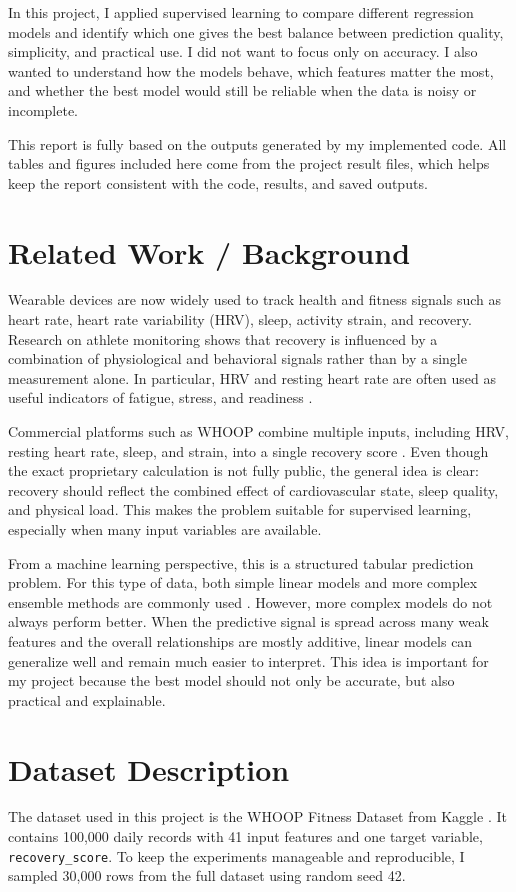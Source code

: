 \documentclass[conference]{IEEEtran}
\begin{document}
In this project, I applied supervised learning to compare different regression models and identify which one gives the best balance between prediction quality, simplicity, and practical use. I did not want to focus only on accuracy. I also wanted to understand how the models behave, which features matter the most, and whether the best model would still be reliable when the data is noisy or incomplete.

This report is fully based on the outputs generated by my implemented code. All tables and figures included here come from the project result files, which helps keep the report consistent with the code, results, and saved outputs.

\section{Related Work / Background}
Wearable devices are now widely used to track health and fitness signals such as heart rate, heart rate variability (HRV), sleep, activity strain, and recovery. Research on athlete monitoring shows that recovery is influenced by a combination of physiological and behavioral signals rather than by a single measurement alone. In particular, HRV and resting heart rate are often used as useful indicators of fatigue, stress, and readiness \cite{plews2013heart,bellenger2016monitoring}.

Commercial platforms such as WHOOP combine multiple inputs, including HRV, resting heart rate, sleep, and strain, into a single recovery score \cite{whoop2023methodology}. Even though the exact proprietary calculation is not fully public, the general idea is clear: recovery should reflect the combined effect of cardiovascular state, sleep quality, and physical load. This makes the problem suitable for supervised learning, especially when many input variables are available.

From a machine learning perspective, this is a structured tabular prediction problem. For this type of data, both simple linear models and more complex ensemble methods are commonly used \cite{sklearn,chen2016xgboost}. However, more complex models do not always perform better. When the predictive signal is spread across many weak features and the overall relationships are mostly additive, linear models can generalize well and remain much easier to interpret. This idea is important for my project because the best model should not only be accurate, but also practical and explainable.

\section{Dataset Description}
The dataset used in this project is the WHOOP Fitness Dataset from Kaggle \cite{kaggle_whoop}. It contains 100{,}000 daily records with 41 input features and one target variable, \texttt{recovery\_score}. To keep the experiments manageable and reproducible, I sampled 30{,}000 rows from the full dataset using random seed 42.
\end{document}

